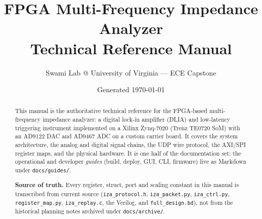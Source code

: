 \documentclass[11pt,openany]{report}
\title{\vspace{-1cm}\textbf{FPGA Multi-Frequency Impedance Analyzer}\\[4pt]
       \large Technical Reference Manual}
\author{Swami Lab @ University of Virginia --- ECE Capstone}
\date{Generated \today}
\newcommand{\file}[1]{\texttt{#1}}
\begin{document}
\maketitle

\begin{abstract}
\noindent This manual is the authoritative technical reference for the FPGA-based
multi-frequency impedance analyzer: a digital lock-in amplifier (DLIA) and
low-latency triggering instrument implemented on a Xilinx Zynq-7020 (Trenz
TE0720 SoM) with an AD9122 DAC and AD9467 ADC on a custom carrier board. It
covers the system architecture, the analog and digital signal chains, the
UDP wire protocol, the AXI/SPI register maps, and the physical hardware. It is
one half of the documentation set; the operational and developer \emph{guides}
(build, deploy, GUI, CLI, firmware) live as Markdown under \file{docs/guides/}.

\medskip\noindent\textbf{Source of truth.} Every register, struct, port and
scaling constant in this manual is transcribed from current source
(\file{iza\_protocol.h}, \file{iza\_packet.py}, \file{iza\_ctrl.py},
\file{register\_map.py}, \file{iza\_replay.c}, the Verilog, and
\file{full\_design.bd}), not from the historical planning notes archived under
\file{docs/archive/}.
\end{abstract}

\tableofcontents






\end{document}
